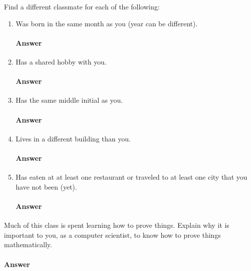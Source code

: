 \documentclass{article}
\begin{document}
Find a different classmate for each of the following:
\begin{enumerate}
    \item Was born in the same month as you (year can be different).
        \paragraph{Answer} 

    \item Has a shared hobby with you.
        \paragraph{Answer} 

    \item Has the same middle initial as you.
        \paragraph{Answer} 

    \item Lives in a different building than you.
        \paragraph{Answer} 

    \item Has eaten at at least one restaurant or traveled to at least one city that you have not been
        (yet).
        \paragraph{Answer} 

\end{enumerate}

\collab{\todo{}}

Much of this class is spent learning how to prove things.  Explain why it is
important to you, as a computer scientist, to know how to prove things
mathematically.

\paragraph{Answer}
\end{document}
